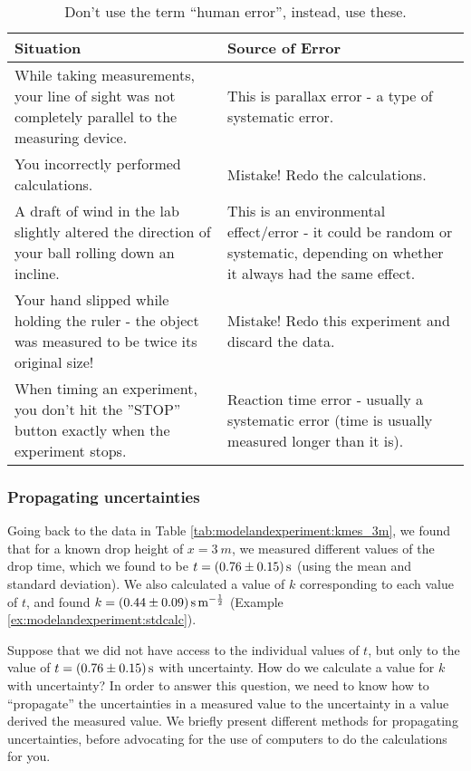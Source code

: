 \begin{table}[H]
\centering
\begin{tabular}{p{3in}p{3in}} 
\textbf{Situation} &\textbf{Source of Error} \\
\hline
\hline
While taking measurements, your line of sight was not completely parallel to the measuring device. & This is parallax error - a type of systematic error.\\ \hline
You incorrectly performed calculations. & Mistake! Redo the calculations.\\ \hline
A draft of wind in the lab slightly altered the direction of your ball rolling down an incline. & This is an environmental effect/error - it could be random or systematic, depending on whether it always had the same effect.\\ \hline
Your hand slipped while holding the ruler - the object was measured to be twice its original size! & Mistake! Redo this experiment and discard the data.\\ \hline
When timing an experiment, you don't hit the ''STOP'' button exactly when the experiment stops. & Reaction time error - usually a systematic error (time is usually measured longer than it is).\\ \hline
\end{tabular}
\caption{\label{tab:modelandexperiment:humanerror} Don't use the term ``human error'', instead, use these.}
\end{table}

\subsubsection{Propagating uncertainties}
Going back to the data in Table \ref{tab:modelandexperiment:kmes_3m}, we found that for a known drop height of $x=\SI{3}{m}$, we measured different values of the drop time, which we found to be $t=\SI{0.76 \pm 0.15}{s}$ (using the mean and standard deviation). We also calculated a value of $k$ corresponding to each value of $t$, and found $k=\SI{0.44 \pm 0.09}{s.m^{-\frac{1}{2}}}$ (Example \ref{ex:modelandexperiment:stdcalc}).

Suppose that we did not have access to the individual values of $t$, but only to the value of $t=\SI{0.76 \pm 0.15}{s}$ with uncertainty. How do we calculate a value for $k$ with uncertainty? In order to answer this question, we need to know how to ``propagate'' the uncertainties in a measured value to the uncertainty in a value derived the measured value. We briefly present different methods for propagating uncertainties, before advocating for the use of computers to do the calculations for you.

